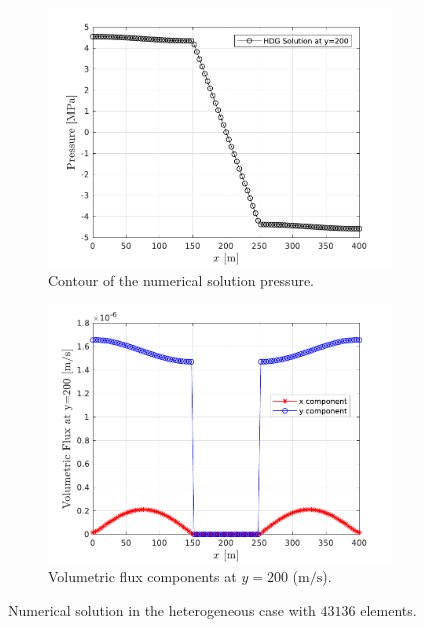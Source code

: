\documentclass[review]{elsarticle}
\begin{document}
\begin{figure}[H]
	\begin{subfigure}[b]{0.45\textwidth}
		\centering
		\includegraphics[width=\textwidth]{./Figures/Examples/FiveSpot_Hetero/5spot2_P_L200.pdf}
		\caption[Test geometry 2]{Contour of the numerical solution pressure.}
		\label{fig:5puntosAn2i}
	\end{subfigure}
	\begin{subfigure}[b]{0.45\textwidth}
		\centering
		\includegraphics[width=1\textwidth]{./Figures/Examples/FiveSpot_Hetero/5spot2_Grad_L200}
		\caption[Test geometry 2]{Volumetric flux components at $y=200$ ($\mathrm{m}/\mathrm{s}$).}
		\label{fig:5puntos2_GradL200}
	\end{subfigure}

	\caption{Numerical solution in the heterogeneous case with $43136$ elements.}
	\label{fig:fiveResult2}
\end{figure}
\end{document}
